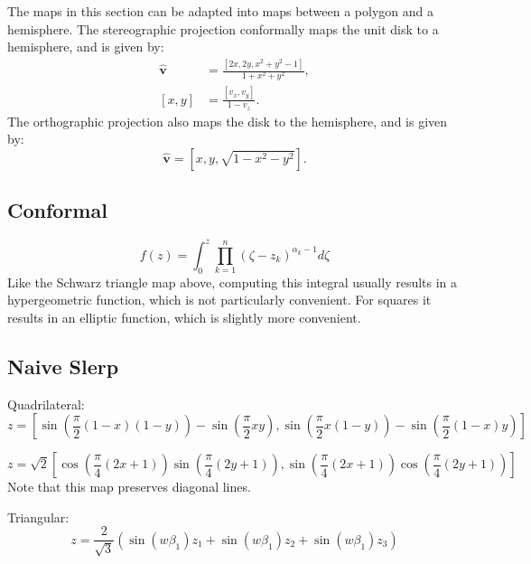 \documentclass{amsart}[12pt]
\begin{document}
The maps in this section can be adapted into maps between a polygon and a hemisphere.
The stereographic projection conformally maps the unit disk to a hemisphere,
and is given by:
\begin{equation}\begin{split}
  \hat{\mathbf v} &= \frac{[2x, 2y, x^2+y^2-1]}{1+x^2+y^2}, \\
  [x, y] & = \frac{[v_x, v_y]}{1-v_z}.
\end{split}\end{equation}
The orthographic projection also maps the disk to the hemisphere,
and is given by:
\begin{equation}
  \hat{\mathbf v} = [x, y, \sqrt{1-x^2-y^2}].
\end{equation}
\subsection{Conformal}
\begin{equation}
f(z) = \int_0^z \prod_{k=1}^n (\zeta - z_k)^{\alpha_k-1} d\zeta
\end{equation}
 Like the Schwarz triangle map above,
computing this integral usually results in a hypergeometric function,
which is not particularly convenient. For squares it results in an elliptic
function, which is slightly more convenient.\cite{fong16}

\subsection{Naive Slerp}

Quadrilateral:
\begin{equation}
z = \left[\sin\left(\frac{\pi}{2} (1-x)(1-y)\right)
- \sin\left(\frac{\pi}{2} x y\right),
\sin\left(\frac{\pi}{2} x (1-y)\right)
- \sin\left(\frac{\pi}{2} (1-x) y\right)\right]
\end{equation}

\begin{equation}
z = \sqrt 2 \left[\cos\left(\frac{\pi}{4} (2x+1)\right)
\sin\left(\frac{\pi}{4} (2y+1)\right),
\sin\left(\frac{\pi}{4} (2x+1)\right)
\cos\left(\frac{\pi}{4} (2y+1)\right)\right]
\end{equation}
Note that this map preserves diagonal lines.

Triangular:
\begin{equation}
z = \frac{2}{\sqrt 3} \left(\sin(w \beta_1 ) z_1 + \sin(w \beta_1 ) z_2 + \sin(w \beta_1 ) z_3\right)
\end{equation}
\end{document}
